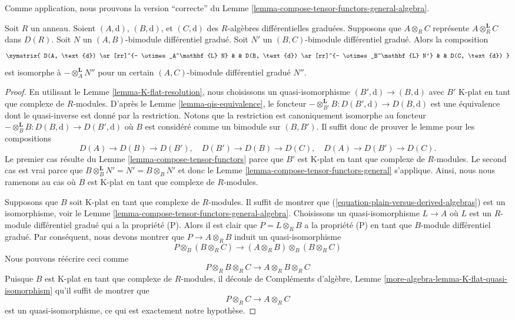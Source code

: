 \noindent
Comme application, nous prouvons la version ``correcte'' du Lemme
\ref{lemma-compose-tensor-functors-general-algebra}.

\begin{lemma}
\label{lemma-compose-tensor-functors-tor}
Soit $R$ un anneau. Soient $(A, \text{d})$, $(B, \text{d})$, et $(C, \text{d})$
des $R$-algèbres différentielles graduées. Supposons que $A \otimes_R C$
représente $A \otimes^\mathbf{L}_R C$ dans $D(R)$. Soit $N$ un
$(A, B)$-bimodule différentiel gradué. Soit $N'$ un $(B, C)$-bimodule différentiel gradué.
Alors la composition
$$
\xymatrix{
D(A, \text{d}) \ar[rr]^{- \otimes_A^\mathbf{L} N} & &
D(B, \text{d}) \ar[rr]^{- \otimes_B^\mathbf{L} N'} & &
D(C, \text{d})
}
$$
est isomorphe à $- \otimes_A^\mathbf{L} N''$ pour un certain
$(A, C)$-bimodule différentiel gradué $N''$.
\end{lemma}

\begin{proof}
En utilisant le Lemme \ref{lemma-K-flat-resolution}, nous choisissons un
quasi-isomorphisme $(B', \text{d}) \to (B, \text{d})$ avec $B'$ K-plat en tant que
complexe de $R$-modules. D'après le Lemme \ref{lemma-qis-equivalence}, le foncteur
$-\otimes^\mathbf{L}_{B'} B : D(B', \text{d}) \to D(B, \text{d})$ est une
équivalence dont le quasi-inverse est donné par la restriction. Notons que la
restriction est canoniquement isomorphe au foncteur $- \otimes^\mathbf{L}_B B :
D(B, \text{d}) \to D(B', \text{d})$ où $B$ est considéré comme un bimodule sur
$(B, B')$. Il suffit donc de prouver le lemme pour les compositions
$$
D(A) \to D(B) \to D(B'),\quad
D(B') \to D(B) \to D(C),\quad
D(A) \to D(B') \to D(C).
$$
Le premier cas résulte du Lemme \ref{lemma-compose-tensor-functors} parce que $B'$ est
K-plat en tant que complexe de $R$-modules. Le second cas est vrai parce que $B
\otimes_B^\mathbf{L} N' = N' = B \otimes_B N'$ et donc le Lemme
\ref{lemma-compose-tensor-functors-general} s'applique. Ainsi, nous nous ramenons au
cas où $B$ est K-plat en tant que complexe de $R$-modules.

\medskip\noindent
Supposons que $B$ soit K-plat en tant que complexe de $R$-modules. Il suffit de
montrer que (\ref{equation-plain-versus-derived-algebras}) est un isomorphisme,
voir le Lemme \ref{lemma-compose-tensor-functors-general-algebra}. Choisissons un
quasi-isomorphisme $L \to A$ où $L$ est un $R$-module différentiel gradué qui a la
propriété (P). Alors il est clair que $P = L \otimes_R B$ a la propriété (P) en
tant que $B$-module différentiel gradué. Par conséquent, nous devons montrer que
$P \to A \otimes_R B$ induit un quasi-isomorphisme
$$
P \otimes_B (B \otimes_R C)
\longrightarrow
(A \otimes_R B) \otimes_B (B \otimes_R C)
$$
Nous pouvons réécrire ceci comme
$$
P \otimes_R B \otimes_R C \longrightarrow A \otimes_R B \otimes_R C
$$
Puisque $B$ est K-plat en tant que complexe de $R$-modules, il découle de
Compléments d'algèbre, Lemme \ref{more-algebra-lemma-K-flat-quasi-isomorphism}
qu'il suffit de montrer que
$$
P \otimes_R C \to A \otimes_R C
$$
est un quasi-isomorphisme, ce qui est exactement notre hypothèse.
\end{proof}

